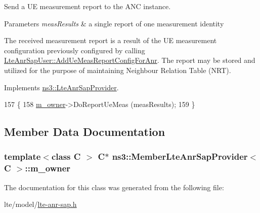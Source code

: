 Send a UE measurement report to the A\+NC instance. 


\begin{DoxyParams}{Parameters}
{\em meas\+Results} & a single report of one measurement identity\\
\hline
\end{DoxyParams}
The received measurement report is a result of the UE measurement configuration previously configured by calling \hyperlink{classns3_1_1LteAnrSapUser_ac65225b3a8f1e011cc0ed2c99df4d139}{Lte\+Anr\+Sap\+User\+::\+Add\+Ue\+Meas\+Report\+Config\+For\+Anr}. The report may be stored and utilized for the purpose of maintaining Neighbour Relation Table (N\+RT). 

Implements \hyperlink{classns3_1_1LteAnrSapProvider_ac4f1114bd33d0c189e2ce2624089e587}{ns3\+::\+Lte\+Anr\+Sap\+Provider}.


\begin{DoxyCode}
157 \{
158   \hyperlink{classns3_1_1MemberLteAnrSapProvider_abceb2e8bbf5bdcdbe0c30caf34a2f1df}{m\_owner}->DoReportUeMeas (measResults);
159 \}
\end{DoxyCode}


\subsection{Member Data Documentation}
\subsubsection[{\texorpdfstring{m\+\_\+owner}{m_owner}}]{\setlength{\rightskip}{0pt plus 5cm}template$<$class C $>$ {\bf C}$\ast$ {\bf ns3\+::\+Member\+Lte\+Anr\+Sap\+Provider}$<$ {\bf C} $>$\+::m\+\_\+owner\hspace{0.3cm}{\ttfamily [private]}}\hypertarget{classns3_1_1MemberLteAnrSapProvider_abceb2e8bbf5bdcdbe0c30caf34a2f1df}{}\label{classns3_1_1MemberLteAnrSapProvider_abceb2e8bbf5bdcdbe0c30caf34a2f1df}


The documentation for this class was generated from the following file\+:\begin{DoxyCompactItemize}
\item 
lte/model/\hyperlink{lte-anr-sap_8h}{lte-\/anr-\/sap.\+h}\end{DoxyCompactItemize}

